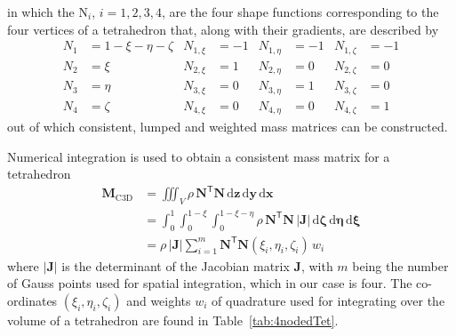 in which the $\mathrm{N}_i$, $i = 1, 2, 3, 4$, are the four shape functions corresponding to the four vertices of a tetrahedron that, along with their gradients, are described by
\begin{subequations}
    \label{tetShapeFunctions}
    \begin{align}
    N_1 & = 1 - \xi - \eta - \zeta & N_{1,\xi} & = -1 &
    N_{1,\eta} & = -1 & N_{1,\zeta} & = -1 \\
    N_2 & = \xi & N_{2,\xi} & = 1 & N_{2,\eta} & = 0 & N_{2,\zeta} & = 0 \\
    N_3 & = \eta & N_{3,\xi} & = 0 & N_{3,\eta} & = 1 & N_{3,\zeta} & = 0 \\
    N_4 & = \zeta & N_{4,\xi} & = 0 & N_{4,\eta} & = 0 & N_{4,\zeta} & = 1 
    \end{align}
\end{subequations}
out of which consistent, lumped and weighted mass matrices can be constructed.

Numerical integration is used to obtain a consistent mass matrix for a tetrahedron
\begin{equation}
\begin{aligned}
\mathbf{M}_{\mathrm{C3D}} & = \iiint_V \rho \, \mathbf{N}^{\mathsf{T}} \mathbf{N} \, \mathrm{d} \mathbf{z} \, \mathrm{d} \mathbf{y} \, \mathrm{d} \mathbf{x} \\ & = \int_0^1 \int_0^{1-\xi} \int_0^{1-\xi-\eta} \rho \, \mathbf{N}^{\mathsf{T}} \mathbf{N} \, | \mathbf{J} | \, \mathrm{d} \mathbf{\zeta} \, \mathrm{d} \mathbf{\eta} \, \mathrm{d} \mathbf{\xi} \\ & = \rho \, |\mathbf{J} | \sum_{i=1}^m \mathbf{N}^{\mathsf{T}} \mathbf{N} (\xi_i , \eta_i , \zeta_i ) \, w_i
\end{aligned}
\label{consMass3D}
\end{equation}
where $|\mathbf{J}|$ is the determinant of the Jacobian matrix $\mathbf{J}$, with $m$ being the number of Gauss points used for spatial integration, which in our case is four.  The co-ordinates $( \xi_i , \eta_i , \zeta_i )$ and weights $w_i$ of quadrature used for integrating over the volume of a tetrahedron are found in Table~\ref{tab:4nodedTet}.

